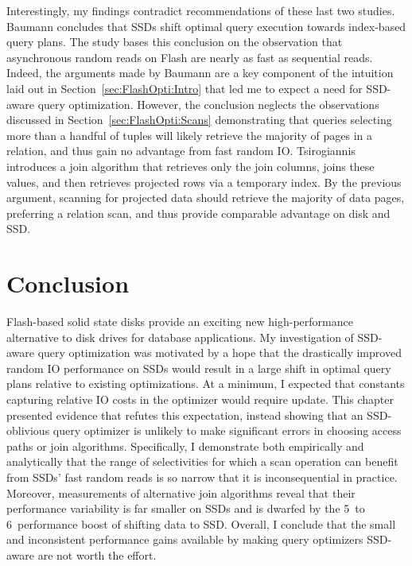 Interestingly, my findings contradict recommendations of these last two studies.
Baumann concludes that SSDs shift optimal query execution towards index-based query plans.
The study bases this conclusion on the observation that asynchronous random reads on Flash are nearly as fast as sequential reads.
Indeed, the arguments made by Baumann are a key component of the intuition laid out in Section~\ref{sec:FlashOpti:Intro} that led me to expect a need for SSD-aware query optimization.
However, the conclusion neglects the observations discussed in Section~\ref{sec:FlashOpti:Scans} demonstrating that queries selecting more than a handful of tuples will likely retrieve the majority of pages in a relation, and thus gain no advantage from fast random IO.
Tsirogiannis introduces a join algorithm that retrieves only the join columns, joins these values, and then retrieves projected rows via a temporary index.
By the previous argument, scanning for projected data should retrieve the majority of data pages, preferring a relation scan, and thus provide comparable advantage on disk and SSD.

\section{Conclusion}
\label{sec:FlashOpti:Conclusion}
Flash-based solid state disks provide an exciting new high-performance alternative to disk drives for database applications.
My investigation of SSD-aware query optimization was motivated by a hope that the drastically improved random IO performance on SSDs would result in a large shift in optimal query plans relative to existing optimizations.
At a minimum, I expected that constants capturing relative IO costs in the optimizer would require update.
This chapter presented evidence that refutes this expectation, instead showing that an SSD-oblivious query optimizer is unlikely to make significant errors in choosing access paths or join algorithms.
Specifically, I demonstrate both empirically and analytically that the range of selectivities for which a scan operation can benefit from SSDs' fast random reads is so narrow that it is inconsequential in practice.
Moreover, measurements of alternative join algorithms reveal that their performance variability is far smaller on SSDs and is dwarfed by the 5\texttimes~to 6\texttimes~performance boost of shifting data to SSD. 
Overall, I conclude that the small and inconsistent performance gains available by making query optimizers SSD-aware are not worth the effort.
